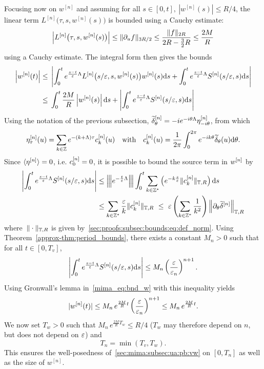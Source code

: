 Focusing now on $w^{[n]}$ and assuming for all $s\in [0,t],\ |w^{[n]}(s)|
\leq R/4$, the linear term $L^{[n]}\big( \tau, s, w^{[n]}(s) \big)$ is
bounded using a Cauchy estimate: 
$$ 
\left| L^{[n]} \big( \tau, s, w^{[n]}(s) \big) \right| \leq \| \partial_{u} f \|_{3R/2} 
\leq \frac{ \| f \|_{2R} }{2R - \frac32 R} 
\leq \frac{2M}{R} 
$$
using a Cauchy estimate. 
%
The integral form then gives the bounds 
\begin{align}
\left| w^{[n]}(t) \right| \leq{}&{} 
	\left| \int_0^t e^{\frac{s-t}{\varepsilon}\Lambda} L^{[n]} \big(s/\varepsilon, s, w^{[n]}(s) \big) w^{[n]}(s) \mathrm{d} s 
			+ \int_0^t e^{\frac{s-t}{\varepsilon}\Lambda} S^{[n]}(s/\varepsilon, s) \mathrm{d} s \right| 
\notag
\\
\leq{}&{}
	\int_0^t \frac{2M}{R} \left| w^{[n]}(s) \right| \mathrm{d} s + \left| \int_0^t e^{\frac{s-t}{\varepsilon}\Lambda} S^{[n]}(s/\varepsilon, s) \mathrm{d} s \right| 
\label{mima_eq:bnd_w}
\end{align}
%
Using the notation of the previous subsection, $\widetilde{\delta} 
^{[n]}_{\theta} = -i e^{-i\theta\Lambda} \eta^{[n]}_{-i\theta}$, from 
which
$$ 
\eta^{[n]}_{\tau}(u) 
= \sum_{k \in \mathbb{Z}} e^{-(k+\Lambda)\tau} c^{[n]}_k(u)
\quad\text{with}\quad
c^{[n]}_k(u) = \frac{1}{2\pi} \int_0^{2\pi} e^{-ik\theta} 
\widetilde{\delta}_{\theta}(u) \mathrm{d}\theta .
$$ 
Since $\langle \eta^{[n]} \rangle = 0$, i.e. $c^{[n]}_0 = 0$, it is
possible to bound the source term in $w^{[n]}$ by
\begin{align*}
\left| \int_0^t e^{\frac{s-t}{\varepsilon}\Lambda} S^{[n]}(s/\varepsilon, s) \mathrm{d} s \right|
&\leq {\left\vert\kern-0.25ex\left\vert\kern-0.25ex\left\vert e^{-\frac{t}{\varepsilon}\Lambda} \right\vert\kern-0.25ex\right\vert\kern-0.25ex\right\vert} \int_0^{t} \sum_{k \in \mathbb{Z}^*}
  \left( e^{-k\frac{s}{\varepsilon}} \| c^{[n]}_k \|_{\mathbb{T},R} \right) \mathrm{d} s
\\
&\leq \sum_{k \in \mathbb{Z}^*} \frac{\varepsilon}{k} \| c^{[n]}_k \|_{\mathbb{T}, R} 
\ \leq\ \varepsilon \left( \sum_{k\in\mathbb{Z}^*} \frac{1}{k^2} \right) 
  \left\| \partial_{\theta} \widetilde{\delta}^{[n]} \right\|_{\mathbb{T}, R}
\end{align*}
%
where~$\| \cdot \|_{\mathbb{T}, R}$ is given
by~\eqref{sec:proofs:subsec:bounds:eq:def_norm}. Using
Theorem~\ref{approx-thm:period_bounds}, there exists a constant $M_n > 0$
such that for all $t \in [0, T_v]$, 
\begin{equation}
\left| \int_0^t e^{\frac{s-t}{\varepsilon}\Lambda} S^{[n]}(s/\varepsilon, s) \mathrm{d} s \right| \leq M_n \left( \frac{\varepsilon}{\varepsilon_n} \right)^{n+1} . 
\end{equation}
%
Using Gronwall's lemma in~\eqref{mima_eq:bnd_w} with this inequality
yields 
$$ 
| w^{[n]}(t) | \leq M_n\, e^{\frac{2M}{R} t} \left( \frac{\varepsilon}{\varepsilon_n} \right)^{n+1} \leq M_n\, e^{\frac{2M}{R} t} . 
$$
%
We now set $T_w > 0$ such that $M_n\, e^{\frac{2M}{R} T_w} \leq R/4$
($T_w$ may therefore depend on $n$, but does not depend on $\varepsilon$) and 
$$ T_n = \min ( T_v, T_w ). $$
%
This ensures the well-posedness of~\eqref{sec:mima:subsec:ua:pb:vw} on
$[0,T_n]$ as well as the size of $w^{[n]}$.


